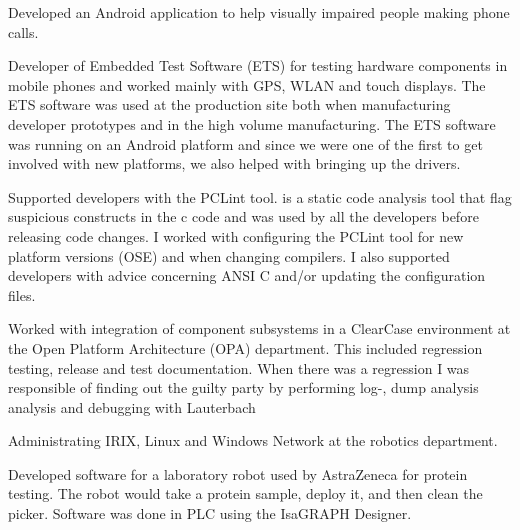 \documentclass{article}
\begin{document}
{Developed an Android application to help visually impaired people making
  phone calls.} 
\sepspace

  {Developer of Embedded Test Software (ETS) for testing hardware components in
    mobile phones and worked mainly with GPS, WLAN and touch displays. The ETS
    software was used at the production site both when manufacturing developer
    prototypes and in the high volume manufacturing. The ETS software was
    running on an Android platform and since we were one of the first to get
    involved with new platforms, we also helped with bringing up the drivers.}
\sepspace

  {Supported developers with the PCLint tool. is a static code analysis tool
    that flag suspicious constructs in the c code and was used by all the
    developers before releasing code changes. I worked with configuring the
    PCLint tool for new platform versions (OSE) and when changing compilers. I
    also supported developers with advice concerning ANSI C and/or updating the
    configuration files. 
  }
\sepspace

  {Worked with integration of component subsystems in a ClearCase environment
    at the Open Platform Architecture (OPA) department. This included
    regression testing, release and test documentation.  When there was a
    regression I was responsible of finding out the guilty party by performing
    log-, dump analysis analysis and debugging with Lauterbach}
\sepspace

\sepspace

  {Administrating IRIX, Linux and Windows Network at the robotics department.}
\sepspace

  {Developed software for a laboratory robot used by AstraZeneca for protein testing. 
  The robot would take a protein sample, deploy it, and then clean the picker. 
  Software was done in PLC using the IsaGRAPH Designer.}
\sepspace
\end{document}

